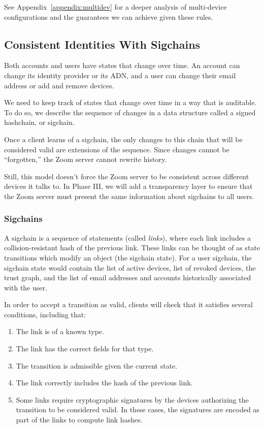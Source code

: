 See Appendix~\ref{appendix:multidev} for a deeper analysis of multi-device configurations and the
guarantees we can achieve given these rules.

\subsection{Consistent Identities With Sigchains}
\label{subsec:sigchains}

Both accounts and users have states that change over time. An account can change its
identity provider or its ADN, and a user can change their email address or add and remove
devices.

We need to keep track of states that change over time in a way that is auditable.
To do so, we describe the sequence of changes in a data structure called a signed
hashchain, or sigchain.

Once a client learns of a sigchain, the only changes to this chain that will be considered valid are
extensions of the sequence. Since changes cannot be ``forgotten,” the Zoom server cannot rewrite
history.

Still, this model doesn't force the Zoom server to be consistent across different devices it talks to.
In Phase III, we will add a transparency layer to ensure that the Zoom server must present the same
information about sigchains to all users.

\subsubsection{Sigchains}

A sigchain is a sequence of statements (called \textit{links}), where each link includes a
collision-resistant hash of the previous link. These links can be thought of as state transitions
which modify an object (the sigchain state). For a user sigchain, the sigchain state would contain
the list of active devices, list of revoked devices, the trust graph, and the list of email
addresses and accounts historically associated with the user.

In order to accept a transition as valid, clients will check that it satisfies several conditions,
including that:

\begin{enumerate}
\item The link is of a known type.
\item The link has the correct fields for that type.
\item The transition is admissible given the current state.
\item The link correctly includes the hash of the previous link.
\item Some links require cryptographic signatures by the devices authorizing the transition
    to be considered valid. In these cases, the signatures are encoded as part of the links to
    compute link hashes.
\end{enumerate}

